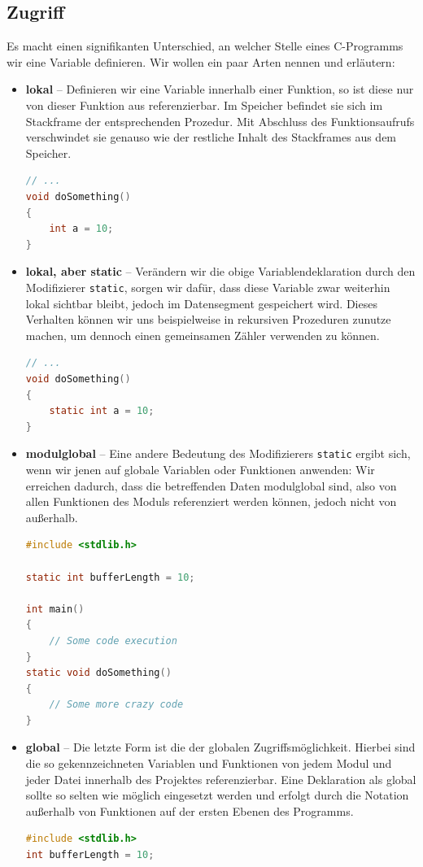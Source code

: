 \documentclass[11pt,a4paper]{scrartcl}
\begin{document}
\subsection{Zugriff}
Es macht einen signifikanten Unterschied, an welcher Stelle eines C-Programms wir eine Variable definieren. Wir wollen ein paar Arten nennen und erläutern:
\begin{itemize}
\item \textbf{lokal} -- Definieren wir eine Variable innerhalb einer Funktion, so ist diese nur von dieser Funktion aus referenzierbar. Im Speicher befindet sie sich im Stackframe der entsprechenden Prozedur. Mit Abschluss des Funktionsaufrufs verschwindet sie genauso wie der restliche Inhalt des Stackframes aus dem Speicher.
\begin{lstlisting}[language=C]
// ...
void doSomething() 
{
	int a = 10;
}
\end{lstlisting}
\item \textbf{lokal, aber static} -- Verändern wir die obige Variablendeklaration durch den Modifizierer \texttt{static}, sorgen wir dafür, dass diese Variable zwar weiterhin lokal sichtbar bleibt, jedoch im Datensegment gespeichert wird. Dieses Verhalten können wir uns beispielweise in rekursiven Prozeduren zunutze machen, um dennoch einen gemeinsamen Zähler verwenden zu können.
\begin{lstlisting}[language=C]
// ...
void doSomething() 
{
	static int a = 10;
}
\end{lstlisting}
\item \textbf{modulglobal} -- Eine andere Bedeutung des Modifizierers \texttt{static} ergibt sich, wenn wir jenen auf globale Variablen oder Funktionen anwenden: Wir erreichen dadurch, dass die betreffenden Daten modulglobal sind, also von allen Funktionen des Moduls referenziert werden können, jedoch nicht von außerhalb. 
\begin{lstlisting}[language=C]
#include <stdlib.h>

static int bufferLength = 10;

int main() 
{
	// Some code execution
}
static void doSomething() 
{
	// Some more crazy code
}
\end{lstlisting}
\item \textbf{global} -- Die letzte Form ist die der globalen Zugriffsmöglichkeit. Hierbei sind die so gekennzeichneten Variablen und Funktionen von jedem Modul und jeder Datei innerhalb des Projektes referenzierbar. Eine Deklaration als global sollte so selten wie möglich eingesetzt werden und erfolgt durch die Notation außerhalb von Funktionen auf der ersten Ebenen des Programms.
\begin{lstlisting}[language=C]
#include <stdlib.h>
int bufferLength = 10;


\end{lstlisting}
\end{itemize}
\end{document}
